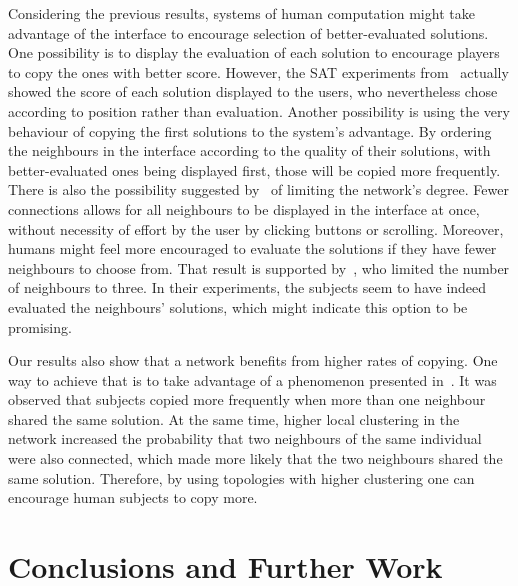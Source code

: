 \documentclass{article}
\begin{document}
Considering the previous results, systems of human computation might take advantage of the interface to encourage selection of better-evaluated solutions. One possibility is to display the evaluation of each solution to encourage players to copy the ones with better score. However, the SAT experiments from~\cite{farenzena:collabem} actually showed the score of each solution displayed to the users, who nevertheless chose according to position rather than evaluation. Another possibility is using the very behaviour of copying the first solutions to the system's advantage. By ordering the neighbours in the interface according to the quality of their solutions, with better-evaluated ones being displayed first, those will be copied more frequently. There is also the possibility suggested by~\cite{farenzena:collabem} of limiting the network's degree. Fewer connections allows for all neighbours to be displayed in the interface at once, without necessity of effort by the user by clicking buttons or scrolling. Moreover, humans might feel more encouraged to evaluate the solutions if they have fewer neighbours to choose from. That result is supported by~\cite{mason:collablearnet}, who limited the number of neighbours to three. In their experiments, the subjects seem to have indeed evaluated the neighbours' solutions, which might indicate this option to be promising.

Our results also show that a network benefits from higher rates of copying. One way to achieve that is to take advantage of a phenomenon presented in~\cite{mason:collablearnet}. It was observed that subjects copied more frequently when more than one neighbour shared the same solution. At the same time, higher local clustering in the network increased the probability that two neighbours of the same individual were also connected, which made more likely that the two neighbours shared the same solution. Therefore, by using topologies with higher clustering one can encourage human subjects to copy more.

\section{Conclusions and Further Work}
\end{document}
